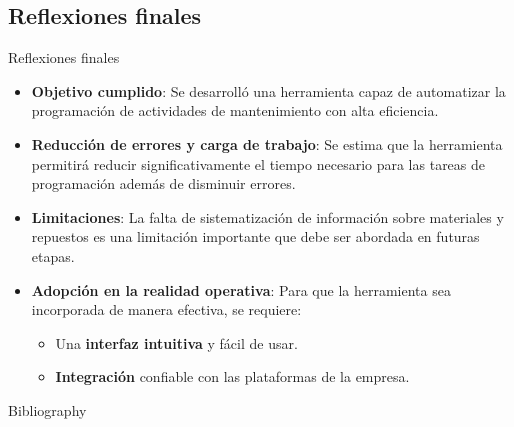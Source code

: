 \documentclass[pdfpagelabels=false, usepdftitle=false, aspectratio=169]{beamer}
\begin{document}
\subsection{Reflexiones finales}
\begin{frame}{Reflexiones finales}
\begin{itemize}
    \item \textbf{Objetivo cumplido}: Se desarrolló una herramienta capaz de automatizar la programación de actividades de mantenimiento con alta eficiencia.
    \vfill
    \item \textbf{Reducción de errores y carga de trabajo}: Se estima que la herramienta permitirá reducir significativamente el tiempo necesario para las tareas de programación además de disminuir errores.
    \vfill
    \item \textbf{Limitaciones}: La falta de sistematización de información sobre materiales y repuestos es una limitación importante que debe ser abordada en futuras etapas.
    \item \textbf{Adopción en la realidad operativa}: Para que la herramienta sea incorporada de manera efectiva,
          se requiere:
    \begin{itemize}
        \item Una \textbf{interfaz intuitiva} y fácil de usar.
        \item \textbf{Integración} confiable con las plataformas de la empresa.
    \end{itemize}
    \vfill
\end{itemize}
\vfill
\end{frame}


\begin{frame}{Bibliography}
\tiny 


\end{frame}
\end{document}
